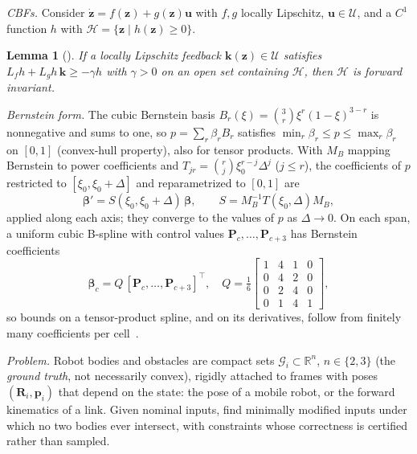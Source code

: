 \documentclass[journal]{IEEEtran}
\newtheorem{lemma}{Lemma}
\theoremstyle{definition}
\newcommand{\R}{\mathbb{R}}
\newcommand{\Rot}{\mathbf{R}}
\begin{document}
\emph{CBFs.} Consider $\dot{\mathbf z}=f(\mathbf z)+g(\mathbf z)\mathbf u$ with $f,g$ locally
Lipschitz, $\mathbf u\in\mathcal U$, and a $C^1$ function $h$ with
$\mathcal H=\{\mathbf z\mid h(\mathbf z)\ge0\}$.
\begin{lemma}[\cite{ames2019cbf}]\label{lem:cbf}
If a locally Lipschitz feedback $\mathbf k(\mathbf z)\in\mathcal U$ satisfies
$L_fh+L_gh\,\mathbf k\ge-\gamma h$ with $\gamma>0$ on an open set containing $\mathcal H$, then
$\mathcal H$ is forward invariant.
\end{lemma}

\emph{Bernstein form.} The cubic Bernstein basis $B_r(\xi)=\binom3r\xi^r(1-\xi)^{3-r}$ is
nonnegative and sums to one, so $p=\sum_r\beta_rB_r$ satisfies $\min_r\beta_r\le p\le\max_r\beta_r$
on $[0,1]$ (convex-hull property), also for tensor products. With $M_B$ mapping Bernstein to power
coefficients and $T_{jr}=\binom rj\xi_0^{r-j}\Delta^j$ ($j\le r$), the coefficients of $p$ restricted
to $[\xi_0,\xi_0+\Delta]$ and reparametrized to $[0,1]$ are
\begin{equation}\label{eq:subdiv}
\boldsymbol\beta'=S(\xi_0,\xi_0+\Delta)\,\boldsymbol\beta,\qquad S=M_B^{-1}T(\xi_0,\Delta)M_B,
\end{equation}
applied along each axis; they converge to the values of $p$ as $\Delta\to0$. On each span, a uniform
cubic B-spline with control values $\mathbf P_c,\dots,\mathbf P_{c+3}$ has Bernstein coefficients
\begin{equation}\label{eq:b2b}
\boldsymbol\beta_c=Q\,[\mathbf P_{c},\dots,\mathbf P_{c+3}]^{\top},\quad
Q=\tfrac16\left[\begin{smallmatrix}1&4&1&0\\0&4&2&0\\0&2&4&0\\0&1&4&1\end{smallmatrix}\right],
\end{equation}
so bounds on a tensor-product spline, and on its derivatives, follow from finitely many
coefficients per cell~\cite{farin2002curves,jo2027semantic}.

\emph{Problem.} Robot bodies and obstacles are compact sets $\mathcal G_i\subset\R^n$, $n\in\{2,3\}$
(the \emph{ground truth}, not necessarily convex), rigidly attached to frames with poses
$(\Rot_i,\mathbf p_i)$ that depend on the state: the pose of a mobile robot, or the forward
kinematics of a link. Given nominal inputs, find minimally modified inputs under which no two
bodies ever intersect, with constraints whose correctness is certified rather than sampled.
\end{document}
